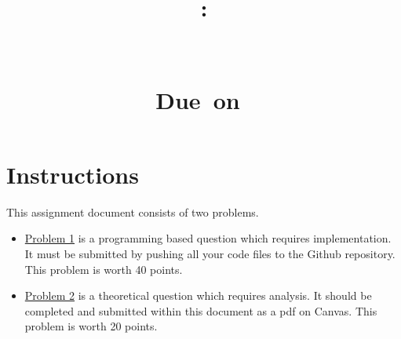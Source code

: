 \documentclass{article}
\title{
	\vspace{2in}
	\textmd{\textbf{\hmwkClass:\\ \hmwkTitle}}\\
	\normalsize\vspace{0.1in}\small{\hmwkClassInstructor}\\
	\normalsize\vspace{0.1in}\small{Due\ on\ \hmwkDueDate}\\
	\vspace{3in}
}
\author{\hmwkAuthorName}
\date{}
\begin{document}
	
\maketitle
	
\pagebreak
\section{Instructions}
This assignment document consists of two problems.

\begin{itemize} 
	\item \underline{Problem 1} is a programming based question which requires implementation. It must be submitted by pushing all your code files to the Github repository. This problem is worth 40 points.
	\item \underline{Problem 2} is a theoretical question which requires analysis. It should be completed and submitted within this document as a pdf on Canvas. This problem is worth 20 points.

\end{itemize}
\end{document}
